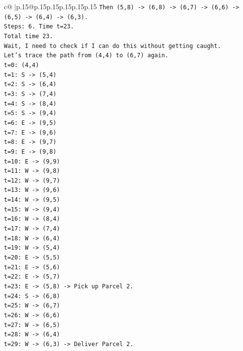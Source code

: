 \documentclass{article}
\begin{document}
{\begin{supertabular}{c@{$\;$}|p{.15\linewidth}@{}p{.15\linewidth}p{.15\linewidth}p{.15\linewidth}p{.15\linewidth}p{.15\linewidth}}
{{{\texttt{Then (5,8) {-}> (6,8) {-}> (6,7) {-}> (6,6) {-}> (6,5) {-}> (6,4) {-}> (6,3).} \\
\texttt{Steps: 6. Time t=23.} \\
\texttt{Total time 23.} \\
\texttt{Wait, I need to check if I can do this without getting caught.} \\
\texttt{Let's trace the path from (4,4) to (6,7) again.} \\
\texttt{t=0: (4,4)} \\
\texttt{t=1: S {-}> (5,4)} \\
\texttt{t=2: S {-}> (6,4)} \\
\texttt{t=3: S {-}> (7,4)} \\
\texttt{t=4: S {-}> (8,4)} \\
\texttt{t=5: S {-}> (9,4)} \\
\texttt{t=6: E {-}> (9,5)} \\
\texttt{t=7: E {-}> (9,6)} \\
\texttt{t=8: E {-}> (9,7)} \\
\texttt{t=9: E {-}> (9,8)} \\
\texttt{t=10: E {-}> (9,9)} \\
\texttt{t=11: W {-}> (9,8)} \\
\texttt{t=12: W {-}> (9,7)} \\
\texttt{t=13: W {-}> (9,6)} \\
\texttt{t=14: W {-}> (9,5)} \\
\texttt{t=15: W {-}> (9,4)} \\
\texttt{t=16: W {-}> (8,4)} \\
\texttt{t=17: W {-}> (7,4)} \\
\texttt{t=18: W {-}> (6,4)} \\
\texttt{t=19: W {-}> (5,4)} \\
\texttt{t=20: E {-}> (5,5)} \\
\texttt{t=21: E {-}> (5,6)} \\
\texttt{t=22: E {-}> (5,7)} \\
\texttt{t=23: E {-}> (5,8) {-}> Pick up Parcel 2.} \\
\texttt{t=24: S {-}> (6,8)} \\
\texttt{t=25: W {-}> (6,7)} \\
\texttt{t=26: W {-}> (6,6)} \\
\texttt{t=27: W {-}> (6,5)} \\
\texttt{t=28: W {-}> (6,4)} \\
\texttt{t=29: W {-}> (6,3) {-}> Deliver Parcel 2.} \\
}}}
\end{supertabular}}
\end{document}
